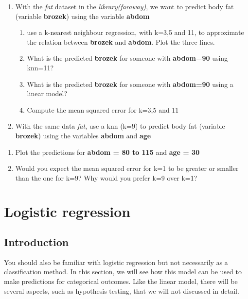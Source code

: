 \documentclass[
]{book}
\begin{document}
\begin{enumerate}
\def\labelenumi{\arabic{enumi})}
\item
  With the \emph{fat} dataset in the \emph{library(faraway)}, we want to predict body
  fat (variable \textbf{brozek}) using the variable \textbf{abdom}

  \begin{enumerate}
  \def\labelenumii{\alph{enumii})}
  \item
    use a k-nearest neighbour regression, with k=3,5 and 11, to approximate
    the relation between \textbf{brozek} and \textbf{abdom}. Plot the three lines.
  \item
    What is the predicted \textbf{brozek} for someone with \textbf{abdom=90} using
    knn=11?
  \item
    What is the predicted \textbf{brozek} for someone with \textbf{abdom=90} using a
    linear model?
  \item
    Compute the mean squared error for k=3,5 and 11
  \end{enumerate}
\item
  With the same data \emph{fat}, use a knn (k=9) to predict body
  fat (variable \textbf{brozek}) using the variables \textbf{abdom} and \textbf{age}
\end{enumerate}

\begin{enumerate}
\def\labelenumi{\alph{enumi})}
\item
  Plot the predictions for \textbf{abdom = 80 to 115} and \textbf{age = 30}
\item
  Would you expect the mean squared error for k=1 to be greater or smaller
  than the one for k=9? Why would you prefer k=9 over k=1?
\end{enumerate}

\chapter{Logistic regression}\label{logistic-regression}

\section{Introduction}\label{lr.intro}

You should also be familiar with logistic regression but not necessarily
as a classification method. In this section, we will see how this model can
be used to make predictions for categorical outcomes.
Like the linear model, there will be several
aspects, such as hypothesis testing, that we will not discussed in detail.
\end{document}
